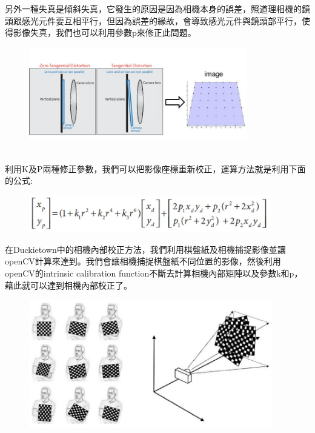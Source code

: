 \documentclass{article}
\begin{document}
另外一種失真是傾斜失真，它發生的原因是因為相機本身的誤差，照道理相機的鏡頭跟感光元件要互相平行，但因為誤差的緣故，會導致感光元件與鏡頭部平行，使得影像失真，我們也可以利用參數p來修正此問題。
\\
\begin{figure}[htp]
    \begin{center}
        \includegraphics[width=270pt]{pic/圖片10.jpg}
    \end{center}
\end{figure}
\\
利用K及P兩種修正參數，我們可以把影像座標重新校正，運算方法就是利用下面的公式:
\\
\begin{figure}[htp]
    \begin{center}
        \includegraphics[width=300pt]{pic/圖片11.jpg}
    \end{center}
\end{figure}

在Duckietown中的相機內部校正方法，我們利用棋盤紙及相機捕捉影像並讓openCV計算來達到。我們會讓相機捕捉棋盤紙不同位置的影像，然後利用openCV的intrinsic calibration function不斷去計算相機內部矩陣以及參數k和p，藉此就可以達到相機內部校正了。
\begin{figure}[htp]
    \begin{center}
        \includegraphics[width=300pt]{pic/圖片12.jpg}
    \end{center}
\end{figure}
\end{document}
